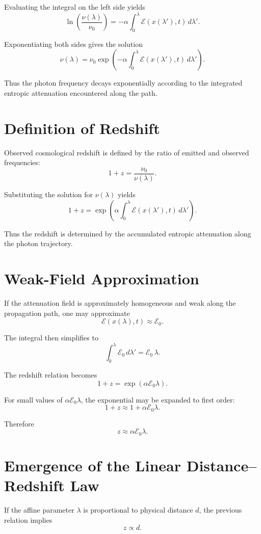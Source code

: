 \documentclass[11pt, openany]{book}
\theoremstyle{plain}
\theoremstyle{definition}
\theoremstyle{remark}
\begin{document}
Evaluating the integral on the left side yields
\[
\ln\!\left(\frac{\nu(\lambda)}{\nu_0}\right)
=
-\alpha\int_0^\lambda
\mathcal{E}(x(\lambda'),t)\,d\lambda'.
\]

Exponentiating both sides gives the solution
\[
\nu(\lambda)
=
\nu_0
\exp\!\left(
-\alpha
\int_0^\lambda
\mathcal{E}(x(\lambda'),t)\,d\lambda'
\right).
\]

Thus the photon frequency decays exponentially according to the
integrated entropic attenuation encountered along the path.

\section{Definition of Redshift}

Observed cosmological redshift is defined by the ratio of emitted and
observed frequencies:
\[
1+z=\frac{\nu_0}{\nu(\lambda)}.
\]

Substituting the solution for $\nu(\lambda)$ yields
\[
1+z
=
\exp\!\left(
\alpha
\int_0^\lambda
\mathcal{E}(x(\lambda'),t)\,d\lambda'
\right).
\]

Thus the redshift is determined by the accumulated entropic attenuation
along the photon trajectory.

\section{Weak-Field Approximation}

If the attenuation field is approximately homogeneous and weak along the
propagation path, one may approximate
\[
\mathcal{E}(x(\lambda),t)\approx\mathcal{E}_0.
\]

The integral then simplifies to
\[
\int_0^\lambda \mathcal{E}_0\,d\lambda'
=
\mathcal{E}_0\,\lambda.
\]

The redshift relation becomes
\[
1+z
=
\exp(\alpha\mathcal{E}_0\lambda).
\]

For small values of $\alpha\mathcal{E}_0\lambda$, the exponential may be
expanded to first order:
\[
1+z\approx 1+\alpha\mathcal{E}_0\lambda.
\]

Therefore
\[
z\approx\alpha\mathcal{E}_0\lambda.
\]

\section{Emergence of the Linear Distance–Redshift Law}

If the affine parameter $\lambda$ is proportional to physical distance
$d$, the previous relation implies
\[
z\propto d.
\]
\end{document}
